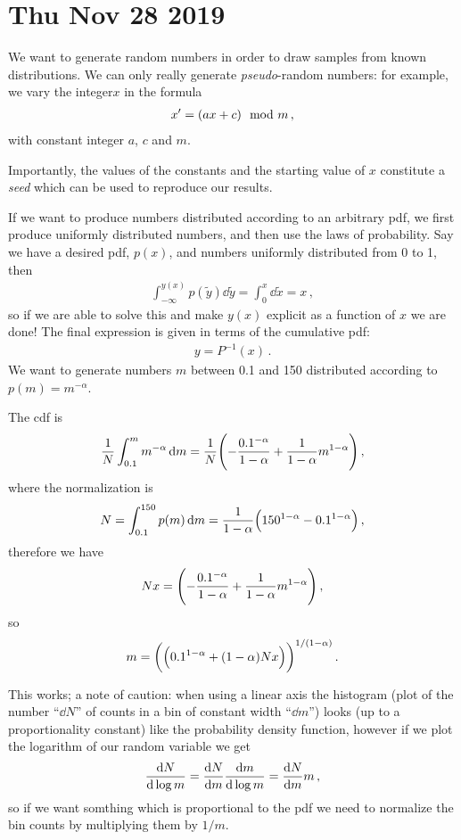 \documentclass[main.tex]{subfiles}
\begin{document}
\section*{Thu Nov 28 2019}

We want to generate random numbers in order to draw samples from known distributions. 
We can only really generate \emph{pseudo}-random numbers: for example, we vary the integer\(x\) in the formula 
%
\begin{align}
  x' = \qty(ax+c) \mod m
\,,
\end{align}
%
with constant integer \(a\), \(c\) and \(m\). 

Importantly, the values of the constants and the starting value of \(x\) constitute a \emph{seed} which can be used to reproduce our results. 

If we want to produce numbers distributed according to an arbitrary pdf, we first produce uniformly distributed numbers, and then use the laws of probability. 
Say we have a desired pdf, \(p(x)\), and numbers uniformly distributed from 0 to 1, then 
%
\begin{align}
  \int_{ - \infty }^{y(x)} p(\widetilde{y}) \dd{\widetilde{y}} = \int_{0}^{x} \dd{\widetilde{x}} = x 
\,,
\end{align}
%
so if we are able to solve this and make \(y(x)\) explicit as a function of \(x\) we are done! The final expression is given in terms of the cumulative pdf: 
%
\begin{align}
  y = P^{-1} (x)
\,.
\end{align}
%
We want to generate numbers \(m\) between 0.1 and 150 distributed according to \(p(m) = m^{-\alpha }\). 

The cdf is 
%
\begin{align}
\frac{1}{N}\int_{0.1}^{m} m^{-\alpha } \dd{m} = \frac{1}{N}\qty(-\frac{0.1^{-\alpha }}{1-\alpha } +  \frac{1}{1-\alpha } m^{1-\alpha }  )
\,,
\end{align}
%
where the normalization is 
%
\begin{align}
  N = \int_{0.1}^{150} p(m) \dd{m} = \frac{1}{1-\alpha } \qty(150^{1-\alpha } - 0.1^{1-\alpha })
\,,
\end{align}
%
therefore we have 
%
\begin{align}
  Nx = \qty(-\frac{0.1^{-\alpha }}{1-\alpha } +  \frac{1}{1-\alpha } m^{1-\alpha }  )
\,,
\end{align}
%
so 
%
\begin{align}
  m = \qty(\qty(0.1^{1-\alpha } +  (1-\alpha ) Nx))^{1/(1-\alpha )}
\,.
\end{align}

This works; a note of caution: when using a linear axis the histogram (plot of the number ``\(\dd{N}\)'' of counts in a bin of constant width ``\(\dd{m}\)'') looks (up to a proportionality constant) like the probability density function, however if we plot the logarithm of our random variable we get 
%
\begin{align}
  \dv{N}{ \log m}  = \dv{N}{m} \dv{m}{\log m} = \dv{N}{m} m
\,,
\end{align}
%
so if we want somthing which is proportional to the pdf we need to normalize the bin counts by multiplying them by \(1/m\).
\end{document}
